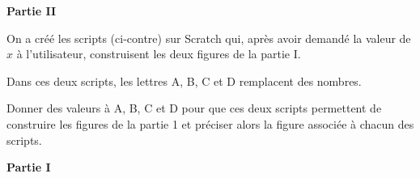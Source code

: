 \documentclass[10pt]{article}
\begin{document}
\bigskip

\textbf{Partie II}

\medskip

On a créé les scripts (ci-contre) sur Scratch qui, après avoir demandé la valeur de $x$ à l'utilisateur, construisent les deux figures de la partie I.

Dans ces deux scripts, les lettres A, B, C et D remplacent des nombres.

Donner des valeurs à A, B, C et D pour que ces deux scripts permettent de construire les figures de la partie 1 et préciser alors la figure associée à chacun des scripts.

\begin{multicols}{2}

\begin{scratch}
    {
    }
\end{scratch}

\begin{scratch}
    {
    }
\end{scratch}

\end{multicols}

\newpage


\textbf{Partie I}
\end{document}
